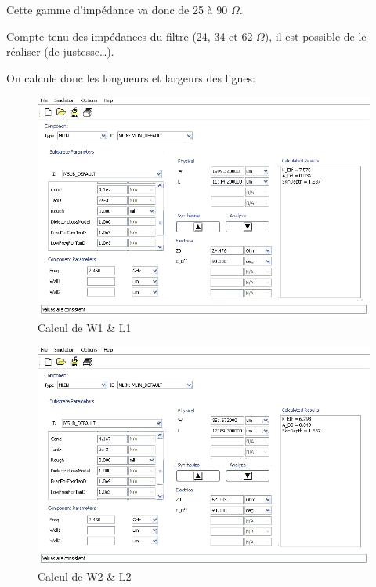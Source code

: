 \documentclass[10pt]{article}
\begin{document}
Cette gamme d’impédance va donc de 25 à 90 $\Omega$.

Compte tenu des impédances du filtre (24, 34 et 62 $\Omega$), il est possible de le réaliser (de justesse…).

On calcule donc les longueurs et largeurs des lignes:

\begin{figure}
    \begin{center}
        \includegraphics[width=15cm]{p21_W1_L1}
    \end{center}
    \caption{Calcul de W1 \& L1}
\end{figure}

\begin{figure}
    \begin{center}
        \includegraphics[width=15cm]{p21_W2_L2}
    \end{center}
    \caption{Calcul de W2 \& L2}
\end{figure}
\end{document}
